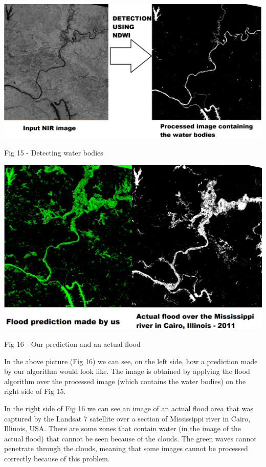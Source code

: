\documentclass[12pt, a4paper]{report}
\begin{document}
\bigskip
\includegraphics[scale=0.3, left]{process1.png}
\begin{center}
Fig 15 - Detecting water bodies
\end{center}
\par 

\includegraphics[scale=0.4, center]{process3.png}
\begin{center}
Fig 16 - Our prediction and an actual flood
\end{center}
\par 

In the above picture (Fig 16) we can see, on the left side, how a prediction made by our algorithm would look like. The image is obtained by applying the flood algorithm over the processed image (which contains the water bodies) on the right side of Fig 15. \par 

In the right side of Fig 16 we can see an image of an actual flood area that was captured by the Landsat 7 satellite over a section of Mississippi river in Cairo, Illinois, USA. There are some zones  that contain water (in the image of the actual flood) that cannot be seen because of the clouds. The green waves cannot penetrate through the clouds, meaning that some images cannot be processed correctly because of this problem.
\par 
\end{document}
